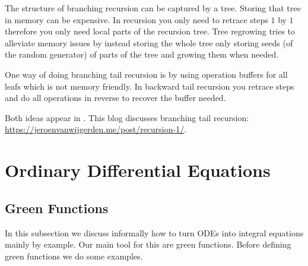 \documentclass[a4paper,12pt]{article}
\begin{document}
\begin{technique}
    The structure of branching recursion can be captured by a tree. Storing that tree
    in memory can be expensive. In recursion you only need to retrace steps
    $1$ by $1$ therefore you only need local parts of the recursion tree. Tree
    regrowing tries to alleviate memory issues by instead storing the whole
    tree only storing seeds (of the random generator) of parts of the
    tree and growing them when needed.
\end{technique}

\begin{technique}
    One way of doing branching tail recursion is by using operation buffers for
    all leafs which is not memory friendly. In backward tail recursion you retrace
    steps and do all operations in reverse to recover the buffer needed.
\end{technique}

\begin{related}
    Both ideas appear in
    \cite{vicini_path_2021}.
    This blog discusses branching tail recursion:
    \url{https://jeroenvanwijgerden.me/post/recursion-1/}.
\end{related}

\section{Ordinary Differential Equations }

%
%


\subsection{Green Functions}
In this subsection we discuss informally how to turn ODEs into integral equations mainly
by example. Our main tool for this are green functions. Before defining green functions
we do some examples.  \\
\end{document}
